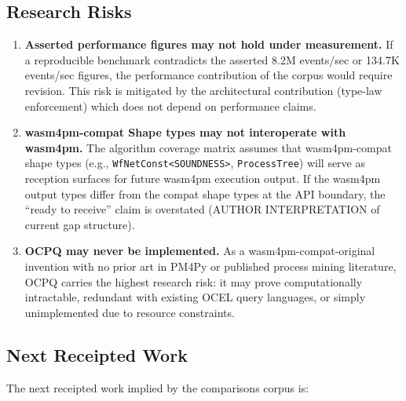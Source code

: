 \subsection{Research Risks}
\label{sec:comparisons-open-risks}

\begin{enumerate}
  \item \textbf{Asserted performance figures may not hold under measurement.}
    If a reproducible benchmark contradicts the asserted 8.2M events/sec or
    134.7K events/sec figures, the performance contribution of the corpus would
    require revision. This risk is mitigated by the architectural contribution
    (type-law enforcement) which does not depend on performance claims.

  \item \textbf{wasm4pm-compat Shape types may not interoperate with wasm4pm.}
    The algorithm coverage matrix assumes that wasm4pm-compat shape types
    (e.g., \texttt{WfNetConst<SOUNDNESS>}, \texttt{ProcessTree}) will serve as
    reception surfaces for future wasm4pm execution output. If the wasm4pm
    output types differ from the compat shape types at the API boundary, the
    ``ready to receive'' claim is overstated (AUTHOR INTERPRETATION of current
    gap structure).

  \item \textbf{OCPQ may never be implemented.} As a wasm4pm-compat-original
    invention with no prior art in PM4Py or published process mining literature,
    OCPQ carries the highest research risk: it may prove computationally
    intractable, redundant with existing OCEL query languages, or simply
    unimplemented due to resource constraints.
\end{enumerate}

\subsection{Next Receipted Work}
\label{sec:comparisons-open-next}

The next receipted work implied by the comparisons corpus is:

